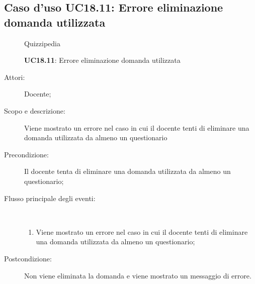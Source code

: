 \subsection{Caso d'uso UC18.11: Errore eliminazione domanda utilizzata}
	\begin{figure}[H]
		\centering
		\begin{resizedtikzpicture}{\textwidth}
		\begin{umlsystem}[x=0, fill=lightgray!20]{Quizzipedia}
		\end{umlsystem}
		\end{resizedtikzpicture}
		\caption{\textbf{UC18.11}: Errore eliminazione domanda utilizzata}
		\label{UC18.11}
	\end{figure}
\begin{description}
\item[Attori:] Docente;
\item[Scopo e descrizione:] Viene mostrato un errore nel caso in cui il docente tenti di eliminare una domanda utilizzata da almeno un questionario
      \item[Precondizione:] Il docente tenta di eliminare una domanda utilizzata da almeno un questionario;

        \item[Flusso principale degli eventi:] \ 
 \begin{enumerate}
          \item Viene mostrato un errore nel caso in cui il docente tenti di eliminare una domanda utilizzata da almeno un questionario;

      \end{enumerate}
    \item[Postcondizione:] Non viene eliminata la domanda e viene mostrato un messaggio di errore.
  \end{description}
\hypertarget{UC19}{}
